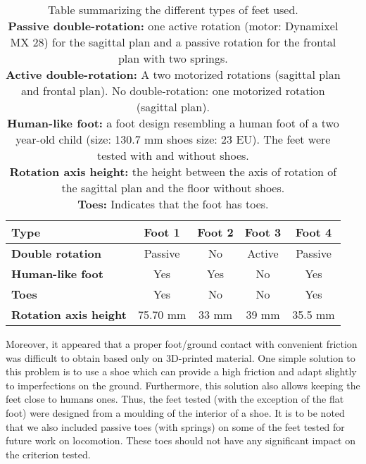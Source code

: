 \begin{table}
    \begin{center}
        \begin{tabular}{|l|c|c|c|c|}
        \hline
        \textbf{Type} & \textbf{Foot 1} & \textbf{Foot 2} & \textbf{Foot 3} & \textbf{Foot 4}\\
        \hline
        \textbf{Double rotation} & Passive & No & Active & Passive\\
        \hline
        \textbf{Human-like foot} & Yes & Yes & No & Yes\\
        \hline
        \textbf{Toes} & Yes & No & No & Yes\\
        \hline
        \textbf{Rotation axis height} & 75.70 mm & 33 mm & 39 mm & 35.5 mm\\
        \hline

        \end{tabular}
        \caption{Table summarizing the different types of feet used.\\
        \textbf{Passive double-rotation:}  one active rotation (motor: Dynamixel MX 28) for the sagittal plan and a passive rotation for the frontal plan with two springs.\\
        \textbf{Active double-rotation:}  A two motorized rotations (sagittal plan and frontal plan). No double-rotation:  one motorized rotation (sagittal plan).\\
        \textbf{Human-like foot:} a foot design resembling a human foot of a two year-old child (size: 130.7 mm shoes size: 23 EU). The feet were tested with and without shoes.\\
        \textbf{Rotation axis height:} the height between the axis of rotation of the sagittal plan and the floor without shoes.\\
        \textbf{Toes:} Indicates that the foot has toes.
        }
        \label{tab:table_feet}
    \end{center}
\end{table}


Moreover, it appeared that a proper foot/ground contact with convenient friction was difficult to obtain based only on 3D-printed material. One simple solution to this problem is to use a shoe which can provide a high friction and adapt slightly to imperfections on the ground. Furthermore, this solution also allows keeping the feet close to humans ones. Thus, the feet tested (with the exception of the flat foot) were designed from a moulding of the interior of a shoe. It is to be noted that we also included passive toes (with springs) on some of the feet tested for future work on locomotion. These toes should not have any significant impact on the criterion tested.


